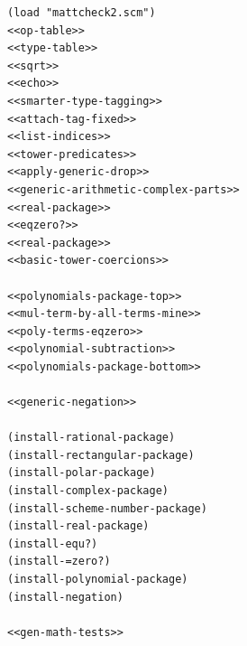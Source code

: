 \documentclass[final,fleqn,titlepage,twoside]{article}
\begin{document}
\begin{verbatim}
(load "mattcheck2.scm")
<<op-table>>
<<type-table>>
<<sqrt>>
<<echo>>
<<smarter-type-tagging>>
<<attach-tag-fixed>>
<<list-indices>>
<<tower-predicates>>
<<apply-generic-drop>>
<<generic-arithmetic-complex-parts>>
<<real-package>>
<<eqzero?>>
<<real-package>>
<<basic-tower-coercions>>

<<polynomials-package-top>>
<<mul-term-by-all-terms-mine>>
<<poly-terms-eqzero>>
<<polynomial-subtraction>>
<<polynomials-package-bottom>>

<<generic-negation>>

(install-rational-package)
(install-rectangular-package)
(install-polar-package)
(install-complex-package)
(install-scheme-number-package)
(install-real-package)
(install-equ?)
(install-=zero?)
(install-polynomial-package)
(install-negation)

<<gen-math-tests>>


\end{verbatim}
\end{document}
